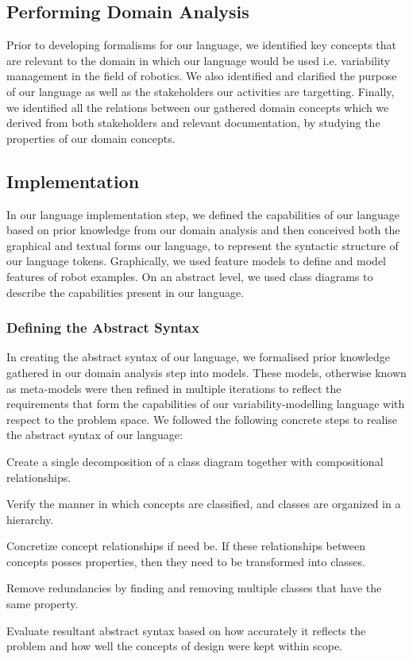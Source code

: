 \documentclass[conference]{IEEEtran}
\begin{document}
\subsection{Performing Domain Analysis}
Prior to developing formalisms for our language, we identified key concepts that are relevant to the domain in which our language would be used i.e. variability management in the field of robotics. We also identified and clarified the purpose of our language as well as the stakeholders our activities are targetting. Finally, we identified all the relations between our gathered domain concepts which we derived from both stakeholders and relevant documentation, by studying the properties of our domain concepts.

\subsection{Implementation}
In our language implementation step, we defined the capabilities of our language based on prior knowledge from our domain analysis and then conceived both the graphical and textual forms our language, to represent the syntactic structure of our language tokens. Graphically, we used feature models to define and model features of robot examples. On an abstract level, we used class diagrams to describe the capabilities present in our language.

\subsubsection{Defining the Abstract Syntax}
In creating the abstract syntax of our language, we formalised prior knowledge gathered in our domain analysis step into models. These models, otherwise known as meta-models were then refined in multiple iterations to reflect the requirements that form the capabilities of our variability-modelling language with respect to the problem space. We followed the following concrete steps to realise the abstract syntax of our language: \begin{enumerate*}[label=(\roman*)]
    \item Create a single decomposition of a class diagram together with compositional relationships.
    \item Verify the manner in which concepts are classified, and classes are organized in a hierarchy.
    \item Concretize concept relationships if need be. If these relationships between concepts posses properties, then they need to be transformed into classes.
    \item Remove redundancies by finding and removing multiple classes that have the same property.
    \item Evaluate resultant abstract syntax based on how accurately it reflects the problem and how well the concepts of design were kept within scope.
\end{enumerate*}
\end{document}

